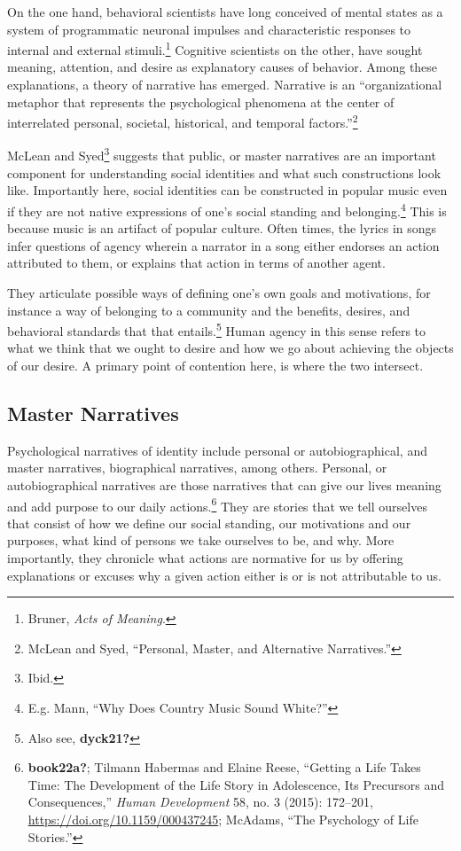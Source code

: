 \documentclass[
  12pt,
]{book}
\theoremstyle{definition}
\theoremstyle{definition}
\theoremstyle{definition}
\theoremstyle{definition}
\theoremstyle{remark}
\begin{document}
On the one hand, behavioral scientists have long conceived of mental states as a system of programmatic neuronal impulses and characteristic responses to internal and external stimuli.\footnote{Bruner, \emph{Acts of Meaning}.} Cognitive scientists on the other, have sought meaning, attention, and desire as explanatory causes of behavior. Among these explanations, a theory of narrative has emerged. Narrative is an ``organizational metaphor that represents the psychological phenomena at the center of interrelated personal, societal, historical, and temporal factors.''\footnote{McLean and Syed, {``Personal, {Master}, and {Alternative Narratives}.''}}

McLean and Syed\footnote{Ibid.} suggests that public, or master narratives are an important component for understanding social identities and what such constructions look like. Importantly here, social identities can be constructed in popular music even if they are not native expressions of one's social standing and belonging.\footnote{E.g. Mann, {``Why Does Country Music Sound White?''}} This is because music is an artifact of popular culture. Often times, the lyrics in songs infer questions of agency wherein a narrator in a song either endorses an action attributed to them, or explains that action in terms of another agent.

They articulate possible ways of defining one's own goals and motivations, for instance a way of belonging to a community and the benefits, desires, and behavioral standards that that entails.\footnote{Also see, \textbf{dyck21?}} Human agency in this sense refers to what we think that we ought to desire and how we go about achieving the objects of our desire. A primary point of contention here, is where the two intersect.

\subsection*{Master Narratives}\label{master-narratives}

Psychological narratives of identity include personal or autobiographical, and master narratives, biographical narratives, among others. Personal, or autobiographical narratives are those narratives that can give our lives meaning and add purpose to our daily actions.\footnote{\textbf{book22a?}; Tilmann Habermas and Elaine Reese, {``Getting a Life Takes Time: The Development of the Life Story in Adolescence, Its Precursors and Consequences,''} \emph{Human Development} 58, no. 3 (2015): 172--201, \url{https://doi.org/10.1159/000437245}; McAdams, {``The {Psychology} of {Life Stories}.''}} They are stories that we tell ourselves that consist of how we define our social standing, our motivations and our purposes, what kind of persons we take ourselves to be, and why. More importantly, they chronicle what actions are normative for us by offering explanations or excuses why a given action either is or is not attributable to us.
\end{document}

